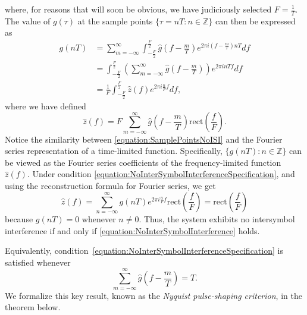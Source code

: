 where, for reasons that will soon be obvious, we have judiciously selected $F = \frac{1}{T}$.
The value of $g(\tau)$ at the sample points $\{ \tau = nT : n \in \mathbb{Z} \}$ can then be expressed as
\begin{equation} \label{equation:SamplePointsNoISI}
\begin{split}
g(nT) &= \sum_{m = -\infty}^{\infty} \int_{-\frac{F}{2}}^{\frac{F}{2}}
\hat{g} \left( f - \frac{m}{T} \right) e^{2 \pi i \left( f - \frac{m}{T} \right) nT} df \\
&= \int_{-\frac{F}{2}}^{\frac{F}{2}}
\left( \sum_{m = -\infty}^{\infty} \hat{g} \left( f - \frac{m}{T} \right) \right)
e^{2 \pi i n T f} df \\
&= \frac{1}{F} \int_{-\frac{F}{2}}^{\frac{F}{2}}
\hat{z} (f) e^{2 \pi i \frac{n}{F} f} df ,
\end{split}
\end{equation}
where we have defined
\begin{equation*}
\hat{z}(f) = F \sum_{m = -\infty}^{\infty} \hat{g} \left( f - \frac{m}{T} \right)
\mathrm{rect} \left( \frac{f}{F} \right) .
\end{equation*}
Notice the similarity between \eqref{equation:SamplePointsNoISI} and the Fourier series representation of a time-limited function.
Specifically, $\{ g(nT) : n \in \mathbb{Z} \}$ can be viewed as the Fourier series coefficients of the frequency-limited function $\hat{z}(f)$.
Under condition \eqref{equation:NoInterSymbolInterferenceSpecification}, and using the reconstruction formula for Fourier series, we get
\begin{equation} \label{equation:NoInterSymbolInterference}
\hat{z}(f) = \sum_{n = -\infty}^{\infty} g(nT) e^{2 \pi i \frac{n}{F} f}
\mathrm{rect} \left( \frac{f}{F} \right)
= \mathrm{rect} \left( \frac{f}{F} \right)
\end{equation}
because $g(nT) = 0$ whenever $n \neq 0$.
Thus, the system exhibits no intersymbol interference if and only if \eqref{equation:NoInterSymbolInterference} holds.

Equivalently, condition~\eqref{equation:NoInterSymbolInterferenceSpecification} is satisfied whenever
\begin{equation} \label{equation:NyquistNoISI}
\sum_{m = -\infty}^{\infty} \hat{g} \left( f - \frac{m}{T} \right) = T .
\end{equation}
We formalize this key result, known as the \emph{Nyquist pulse-shaping criterion}, in the theorem below.

